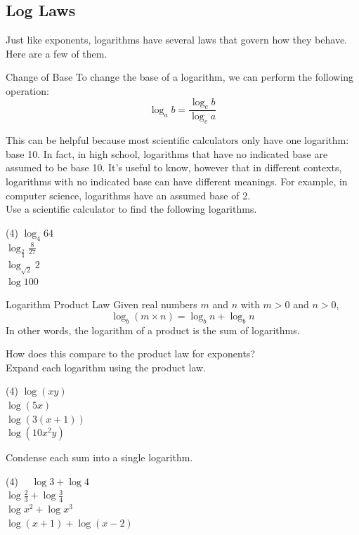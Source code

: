 \documentclass[12pt,fleqn]{book}
\begin{document}
\subsection*{Log Laws}
Just like exponents, logarithms have several laws that govern how they behave.  Here are a few of them.
\begin{thm}{Change of Base}{}
    To change the base of a logarithm, we can perform the following operation:
    \[
        \log_a b = \frac{\log_c b}{\log_c a}
    \]
\end{thm}
This can be helpful because most scientific calculators only have one logarithm: base 10.  In fact, in high school, logarithms that have no indicated base are assumed to be base 10.  It's useful to know, however that in different contexts, logarithms with no indicated base can have different meanings.  For example, in computer science, logarithms have an assumed base of 2.
\\[1em]
Use a scientific calculator to find the following logarithms.
\begin{tasks}(4)
    \task $\log _4 64$
    \\[.5in]
    \task $\log _{\frac{2}{3}} \frac{8}{27}$
    \\[.5in]
    \task $\log _{\sqrt{2}} 2$
    \\[.5in]
    \task $\log 100$
    \\[.5in]
\end{tasks}
\begin{thm}{Logarithm Product Law}{}
    Given real numbers $m$ and $n$ with $m>0$ and $n>0$,
    \[
        \log _b(m \times n)=\log _b n+\log _b n
    \]
    In other words, the logarithm of a product is the sum of logarithms.
\end{thm}
How does this compare to the product law for exponents?
\\[.75in]
Expand each logarithm using the product law.
\begin{tasks}(4)
    \task $\log (x y)$
    \\[.75in]
    \task $\log (5x)$
    \\[.75in]
    \task $\log (3(x+1))$
    \\[.75in]
    \task $\log (10x^2y)$
    \\[.75in]
\end{tasks}
Condense each sum into a single logarithm.
\begin{tasks}(4)
    \task $\quad \log 3+\log 4$
    \\[.5in]
    \task $\log \frac{2}{3}+\log \frac{3}{4}$
    \\[.5in]
    \task $\log x^2+\log x^3$
    \\[.5in]
    \task $\log (x+1)+\log (x-2)$
    \\[.5in]
\end{tasks}
\end{document}
